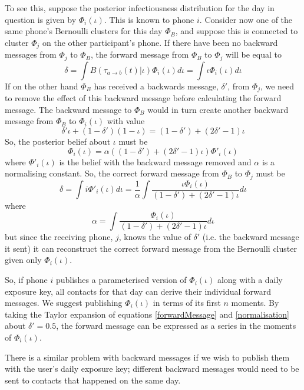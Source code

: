 \documentclass{article}
\begin{document}
To see this, suppose the posterior infectiousness distribution for the day in question is given by $\Phi_i(\iota)$. This is known to phone $i$. Consider now one of the same phone's Bernoulli clusters for this day $\Phi_{B}$, and suppose this is connected to cluster $\Phi_j$ on the other participant's phone. If there have been no backward messages from $\Phi_j$ to $\Phi_{B}$, the forward message from $\Phi_{B}$ to $\Phi_j$ will be equal to
\[
\delta = \int B(\tau_{a\rightarrow b}(t)|\iota)\Phi_i(\iota) d\iota = \int \iota\Phi_i(\iota) d\iota
\]
If on the other hand $\Phi_{B}$ has received a backwards message, $\delta'$,  from $\Phi_j$, we need to remove the effect of this backward message before calculating the forward message. The backward message to $\Phi_{B}$ would in turn create another backward message from $\Phi_{B}$ to $\Phi_i(\iota)$ with value
\[
\delta'\iota + (1-\delta')(1-\iota) = (1 - \delta') + (2\delta' - 1)\iota
\]
So, the posterior belief about $\iota$ must be
\[
\Phi_i(\iota) = \alpha((1 - \delta') + (2\delta' - 1)\iota)\Phi'_i(\iota)
\]
where $\Phi'_i(\iota)$ is the belief with the backward message removed and $\alpha$ is a normalising constant. So, the correct forward message from $\Phi_{B}$ to $\Phi_j$ must be
\begin{equation}
\delta = \int i \Phi'_i(\iota) d\iota = \frac{1}{\alpha}\int \frac{\iota\Phi_i(\iota)}{(1 - \delta') + (2\delta' - 1)\iota} d\iota
\label{forwardMessage}
\end{equation}
where
\begin{equation}
\alpha = \int \frac{\Phi_i(\iota)}{(1 - \delta') + (2\delta' - 1)\iota} d\iota
\label{normalisation}
\end{equation}
but since the receiving phone, $j$, knows the value of $\delta'$ (i.e. the backward message it sent) it can reconstruct the correct forward message from the Bernoulli cluster given only $\Phi_i(\iota)$.

So, if phone $i$ publishes a parameterised version of $\Phi_i(\iota)$ along with a daily exposure key, all contacts for that day can derive their individual forward messages. We suggest publishing $\Phi_i(\iota)$ in terms of its first $n$ moments. By taking the Taylor expansion of equations \ref{forwardMessage} and \ref{normalisation} about $\delta' = 0.5$, the forward message can be expressed as a series in the moments of $\Phi_i(\iota)$.

There is a similar problem with backward messages if we wish to publish them with the user's daily exposure key; different backward messages would need to be sent to contacts that happened on the same day.
\end{document}

